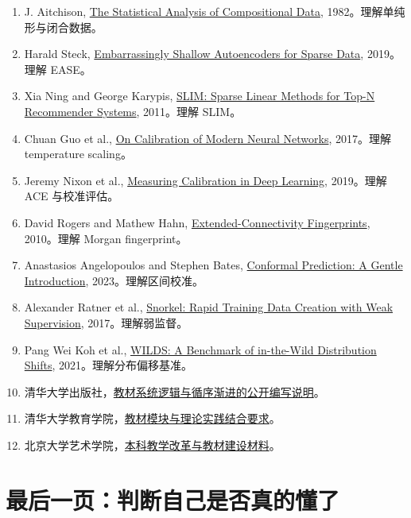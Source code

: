 \documentclass[UTF8,11pt,openany,fontset=none]{ctexbook}
\begin{document}
\begin{enumerate}
\item J. Aitchison, \href{https://doi.org/10.1111/j.2517-6161.1982.tb01195.x}{The Statistical Analysis of Compositional Data}, 1982。理解单纯形与闭合数据。
\item Harald Steck, \href{https://doi.org/10.1145/3308558.3313710}{Embarrassingly Shallow Autoencoders for Sparse Data}, 2019。理解 EASE。
\item Xia Ning and George Karypis, \href{https://doi.org/10.1109/ICDM.2011.134}{SLIM: Sparse Linear Methods for Top-N Recommender Systems}, 2011。理解 SLIM。
\item Chuan Guo et al., \href{https://proceedings.mlr.press/v70/guo17a.html}{On Calibration of Modern Neural Networks}, 2017。理解 temperature scaling。
\item Jeremy Nixon et al., \href{https://doi.org/10.1109/CVPRW.2019.00018}{Measuring Calibration in Deep Learning}, 2019。理解 ACE 与校准评估。
\item David Rogers and Mathew Hahn, \href{https://doi.org/10.1021/ci100050t}{Extended-Connectivity Fingerprints}, 2010。理解 Morgan fingerprint。
\item Anastasios Angelopoulos and Stephen Bates, \href{https://doi.org/10.1561/2200000101}{Conformal Prediction: A Gentle Introduction}, 2023。理解区间校准。
\item Alexander Ratner et al., \href{https://doi.org/10.14778/3157794.3157797}{Snorkel: Rapid Training Data Creation with Weak Supervision}, 2017。理解弱监督。
\item Pang Wei Koh et al., \href{https://proceedings.mlr.press/v139/koh21a.html}{WILDS: A Benchmark of in-the-Wild Distribution Shifts}, 2021。理解分布偏移基准。
\item 清华大学出版社，\href{https://www.tup.com.cn/booksCenter/bookpreface?id=05132301}{教材系统逻辑与循序渐进的公开编写说明}。
\item 清华大学教育学院，\href{https://se.tsinghua.edu.cn/info/1175/1733.htm}{教材模块与理论实践结合要求}。
\item 北京大学艺术学院，\href{https://art.pku.edu.cn/rcpyjxxm/bks/tzgg_bks/14e756b31dbe40eda4cc3cc2547ba73f.htm}{本科教学改革与教材建设材料}。
\end{enumerate}

\backmatter

\chapter*{最后一页：判断自己是否真的懂了}
\end{document}
